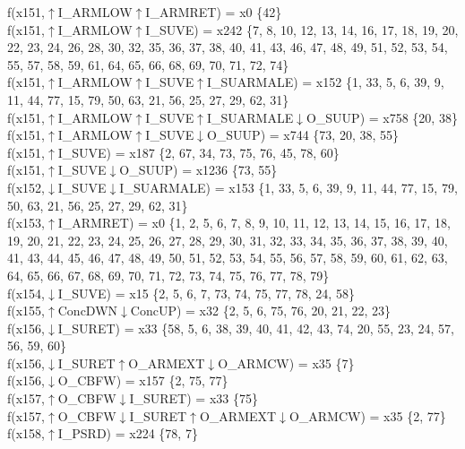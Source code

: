 f(x151,$\uparrow$I\_ARMLOW$\uparrow$I\_ARMRET) = x0 \{42\} \\  
f(x151,$\uparrow$I\_ARMLOW$\uparrow$I\_SUVE) = x242 \{7, 8, 10, 12, 13, 14, 16, 17, 18, 19, 20, 22, 23, 24, 26, 28, 30, 32, 35, 36, 37, 38, 40, 41, 43, 46, 47, 48, 49, 51, 52, 53, 54, 55, 57, 58, 59, 61, 64, 65, 66, 68, 69, 70, 71, 72, 74\} \\  
f(x151,$\uparrow$I\_ARMLOW$\uparrow$I\_SUVE$\uparrow$I\_SUARMALE) = x152 \{1, 33, 5, 6, 39, 9, 11, 44, 77, 15, 79, 50, 63, 21, 56, 25, 27, 29, 62, 31\} \\  
f(x151,$\uparrow$I\_ARMLOW$\uparrow$I\_SUVE$\uparrow$I\_SUARMALE$\downarrow$O\_SUUP) = x758 \{20, 38\} \\  
f(x151,$\uparrow$I\_ARMLOW$\uparrow$I\_SUVE$\downarrow$O\_SUUP) = x744 \{73, 20, 38, 55\} \\  
f(x151,$\uparrow$I\_SUVE) = x187 \{2, 67, 34, 73, 75, 76, 45, 78, 60\} \\  
f(x151,$\uparrow$I\_SUVE$\downarrow$O\_SUUP) = x1236 \{73, 55\} \\  
f(x152,$\downarrow$I\_SUVE$\downarrow$I\_SUARMALE) = x153 \{1, 33, 5, 6, 39, 9, 11, 44, 77, 15, 79, 50, 63, 21, 56, 25, 27, 29, 62, 31\} \\  
f(x153,$\uparrow$I\_ARMRET) = x0 \{1, 2, 5, 6, 7, 8, 9, 10, 11, 12, 13, 14, 15, 16, 17, 18, 19, 20, 21, 22, 23, 24, 25, 26, 27, 28, 29, 30, 31, 32, 33, 34, 35, 36, 37, 38, 39, 40, 41, 43, 44, 45, 46, 47, 48, 49, 50, 51, 52, 53, 54, 55, 56, 57, 58, 59, 60, 61, 62, 63, 64, 65, 66, 67, 68, 69, 70, 71, 72, 73, 74, 75, 76, 77, 78, 79\} \\  
f(x154,$\downarrow$I\_SUVE) = x15 \{2, 5, 6, 7, 73, 74, 75, 77, 78, 24, 58\} \\  
f(x155,$\uparrow$ConcDWN$\downarrow$ConcUP) = x32 \{2, 5, 6, 75, 76, 20, 21, 22, 23\} \\  
f(x156,$\downarrow$I\_SURET) = x33 \{58, 5, 6, 38, 39, 40, 41, 42, 43, 74, 20, 55, 23, 24, 57, 56, 59, 60\} \\  
f(x156,$\downarrow$I\_SURET$\uparrow$O\_ARMEXT$\downarrow$O\_ARMCW) = x35 \{7\} \\  
f(x156,$\downarrow$O\_CBFW) = x157 \{2, 75, 77\} \\  
f(x157,$\uparrow$O\_CBFW$\downarrow$I\_SURET) = x33 \{75\} \\  
f(x157,$\uparrow$O\_CBFW$\downarrow$I\_SURET$\uparrow$O\_ARMEXT$\downarrow$O\_ARMCW) = x35 \{2, 77\} \\  
f(x158,$\uparrow$I\_PSRD) = x224 \{78, 7\} \\  
